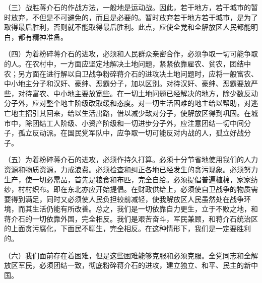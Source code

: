 （三）战胜蒋介石的作战方法，一般地是运动战。因此，若干地方，若干城市的暂时放弃，不但是不可避免的，而且是必要的。暂时放弃若干地方若干城市，是为了取得最后胜利，否则就不能取得最后胜利。此点，应使全党和全解放区人民都能明白，都有精神准备。

（四）为着粉碎蒋介石的进攻，必须和人民群众亲密合作，必须争取一切可能争取的人。在农村中，一方面应坚定地解决土地问题，紧紧依靠雇农、贫农，团结中农；另方面在进行解以自卫战争粉碎蒋介石的进攻决土地问题时，应将一般富农、中小地主分子和汉奸、豪绅、恶霸分子，加以区别。对待汉奸、豪绅、恶霸要放严些，对待富农、中小地主要放宽些。在一切土地问题已经解决的地方，除少数反动分子外，应对整个地主阶级改取缓和态度。对一切生活困难的地主给以帮助，对逃亡地主招引其回来，给以生活出路，借以减少敌对分子，使解放区得到巩固。在城市中，除团结工人阶级、小资产阶级和一切进步分子外，应注意团结一切中间分子，孤立反动派。在国民党军队中，应争取一切可能反对内战的人，孤立好战分子。

（五）为着粉碎蒋介石的进攻，必须作持久打算。必须十分节省地使用我们的人力资源和物质资源，力戒浪费。必须检查和纠正各地已经发生的贪污现象。必须努力生产，使一切必需品，首先是粮食和布匹，完全自给。必须提倡普遍植棉，家家纺纱，村村织布。即在东北亦应开始提倡。在财政供给上，必须使自卫战争的物质需要得到满足，同时又必须使人民负担较前减轻，使我解放区人民虽然处在战争环境，而其生活仍能有所改善。总之，我们是一切依靠自力更生，立于不败之地，和蒋介石的一切依靠外国，完全相反。我们是艰苦奋斗，军民兼顾，和蒋介石统治区的上面贪污腐化，下面民不聊生，完全相反。在这种情形下，我们是一定要胜利的。

（六）我们面前存在着困难，但是这些困难能够克服和必须克服。全党同志和全解放区军民，必须团结一致，彻底粉碎蒋介石的进攻，建立独立、和平、民主的新中国。


